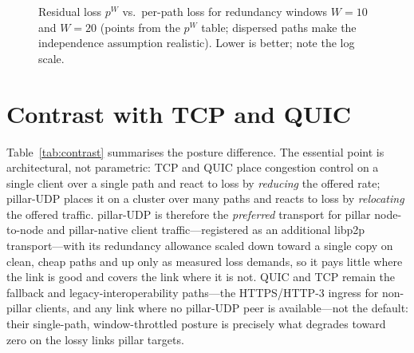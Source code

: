 \documentclass[10pt,twocolumn]{article}
\begin{document}
\begin{figure}[t]
\centering
{}
\caption{Residual loss $p^{W}$ vs.\ per-path loss for redundancy windows
$W{=}10$ and $W{=}20$ (points from the $p^{W}$ table; dispersed paths make the
independence assumption realistic). Lower is better; note the log scale.}
\label{fig:reliability}
\end{figure}

\section{Contrast with TCP and QUIC}
Table~\ref{tab:contrast} summarises the posture difference. The essential point
is architectural, not parametric: TCP and QUIC place congestion control on a
single client over a single path and react to loss by \emph{reducing} the
offered rate; pillar-UDP places it on a cluster over many paths and reacts to
loss by \emph{relocating} the offered traffic. pillar-UDP is therefore the
\emph{preferred} transport for pillar node-to-node and pillar-native client
traffic---registered as an additional libp2p transport---with its redundancy
allowance scaled down toward a single copy on clean, cheap paths and up only as
measured loss demands, so it pays little where the link is good and covers the
link where it is not. QUIC and TCP remain the fallback and legacy-interoperability
paths---the HTTPS/HTTP-3 ingress for non-pillar clients, and any link where no
pillar-UDP peer is available---not the default: their single-path,
window-throttled posture is precisely what degrades toward zero on the lossy
links pillar targets.
\end{document}
